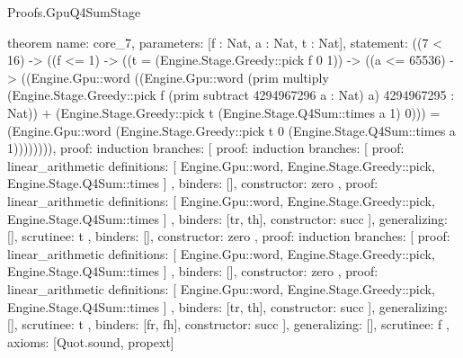 \begin{lexlean}{Proofs.GpuQ4SumStage}
\begin{semanticmodule}
theorem{
  name: core_7,
  parameters: [f : Nat, a : Nat, t : Nat],
  statement: ((7 < 16) -> ((f <= 1) -> ((t = (Engine.Stage.Greedy::pick f 0 1)) -> ((a <= 65536) -> ((Engine.Gpu::word ((Engine.Gpu::word (prim multiply (Engine.Stage.Greedy::pick f (prim subtract 4294967296 a : Nat) a) 4294967295 : Nat)) + (Engine.Stage.Greedy::pick t (Engine.Stage.Q4Sum::times a 1) 0))) = (Engine.Gpu::word (Engine.Stage.Greedy::pick t 0 (Engine.Stage.Q4Sum::times a 1)))))))),
  proof: induction{
    branches: [
      {
        proof: induction{
          branches: [
            {
              proof: linear_arithmetic{
                definitions: [
                  Engine.Gpu::word,
                  Engine.Stage.Greedy::pick,
                  Engine.Stage.Q4Sum::times
                ]
              },
              binders: [],
              constructor: zero
            },
            {
              proof: linear_arithmetic{
                definitions: [
                  Engine.Gpu::word,
                  Engine.Stage.Greedy::pick,
                  Engine.Stage.Q4Sum::times
                ]
              },
              binders: [tr, th],
              constructor: succ
            }
          ],
          generalizing: [],
          scrutinee: t
        },
        binders: [],
        constructor: zero
      },
      {
        proof: induction{
          branches: [
            {
              proof: linear_arithmetic{
                definitions: [
                  Engine.Gpu::word,
                  Engine.Stage.Greedy::pick,
                  Engine.Stage.Q4Sum::times
                ]
              },
              binders: [],
              constructor: zero
            },
            {
              proof: linear_arithmetic{
                definitions: [
                  Engine.Gpu::word,
                  Engine.Stage.Greedy::pick,
                  Engine.Stage.Q4Sum::times
                ]
              },
              binders: [tr, th],
              constructor: succ
            }
          ],
          generalizing: [],
          scrutinee: t
        },
        binders: [fr, fh],
        constructor: succ
      }
    ],
    generalizing: [],
    scrutinee: f
  },
  axioms: [Quot.sound, propext]
}


\end{semanticmodule}
\end{lexlean}
